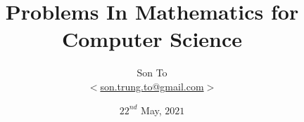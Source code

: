 \documentclass[a4paper,11pt]{memoir}
\theoremstyle{plain} \newtheorem{id}{Lemma}[chapter]
\theoremstyle{definition} \newtheorem{pr}{Problem}[chapter]
\theoremstyle{remark}     \newtheorem{ab}{Remark}[chapter]
\begin{document}
    
    \title{Problems In Mathematics for Computer Science}
    \author{Son To\\
    $<$\href{mailto:son.trung.to@gmail.com}%
    {son.trung.to@gmail.com}$>$}
    \date{$22^{nd}$ May, $2021$}

    \maketitle
    \makeatletter
\end{document}
